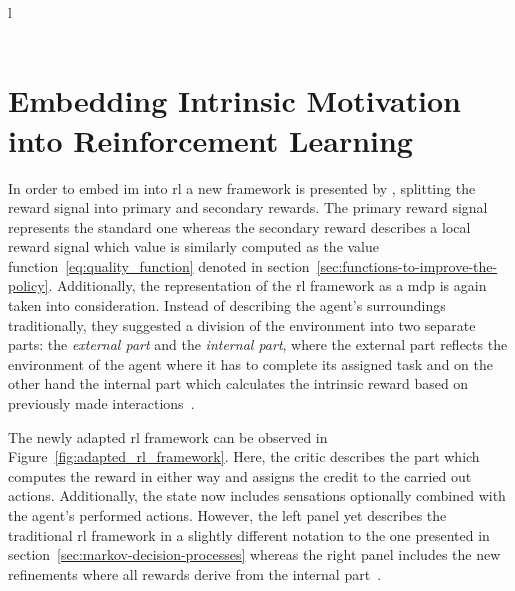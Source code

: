 \documentclass[draft,final]{vutinfth} %
\newcommand{\p}[1]{see p. #1}
\begin{document}
\begin{table}[h]
\begin{tabular}{l}
                                                                                                                          \\ \hline
                                                     \\ \hline
        \end{tabular}
        \caption[Classification of \glspl{im} in \gls{rl}]{Classification of \glspl{im} in \gls{rl}\protect\footnotemark[2]}
        \label{tab:clasification_im_rl}
    \end{table}
    \footnotetext[2]{\citep[\p{9}]{aubret_survey_2019}}

    \section{Embedding Intrinsic Motivation into Reinforcement Learning}\label{sec:embeddingglsinto-theglsframework}

    In order to embed \gls{im} into \gls{rl} a new framework is presented by \citeauthor{singh_intrinsically_2010}, splitting the reward signal into primary and secondary rewards.
    The primary reward signal represents the standard one whereas the secondary reward describes a local reward signal which value is similarly computed as the value function~\eqref{eq:quality_function} denoted in section~\ref{sec:functions-to-improve-the-policy}.
    Additionally, the representation of the \gls{rl} framework as a \gls{mdp} is again taken into consideration.
    Instead of describing the agent's surroundings traditionally, they suggested a division of the environment into two separate parts: the \textit{external part} and the \textit{internal part}, where the external part reflects the environment of the agent where it has to complete its assigned task and on the other hand the internal part which calculates the intrinsic reward based on previously made interactions~\citep{aubret_survey_2019}.

    The newly adapted \gls{rl} framework can be observed in Figure~\ref{fig:adapted_rl_framework}.
    Here, the critic describes the part which computes the reward in either way and assigns the credit to the carried out actions.
    Additionally, the state now includes sensations optionally combined with the agent's performed actions.
    However, the left panel yet describes the traditional \gls{rl} framework in a slightly different notation to the one presented in section~\ref{sec:markov-decision-processes} whereas the right panel includes the new refinements where all rewards derive from the internal part~\citep{singh_intrinsically_2010}.
\end{document}
